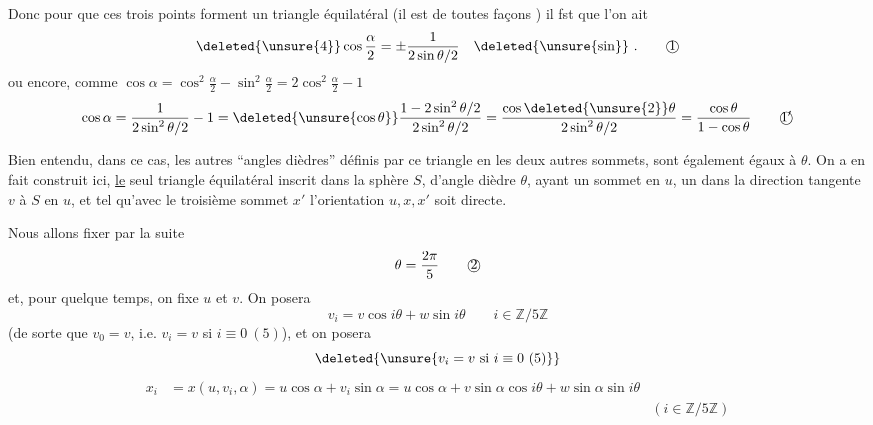 Donc pour que ces trois points forment un triangle équilatéral (il est de toutes façons ) il fst que l'on ait
\[
\deleted{\unsure{4}}\cos\frac{\alpha}{2}=\pm\frac{1}{2\sin\theta/2}\quad\deleted{\unsure{\sin}}\ .\tag*{\textcircled{1}}
\]
ou encore, comme $\cos\alpha=\cos^2\frac{\alpha}{2}-\sin^2\frac{\alpha}{2}=2\cos^2\frac{\alpha}{2}-1$
\[
\cos\alpha=\frac{1}{2\sin^2\theta/2}-1=\deleted{\unsure{\cos\theta}}\frac{1-2\sin^2\theta/2}{2\sin^2\theta/2}
=\frac{\cos\deleted{\unsure{2}}\theta}{2\sin^2\theta/2}=\frac{\cos\theta}{1-\cos\theta}\tag*{\textcircled{$1'$}}
\]

Bien entendu, dans ce cas, les autres ``angles dièdres'' définis par ce triangle en les deux autres sommets, sont également égaux à $\theta$. On a en fait construit ici,  \uline{le} seul triangle équilatéral inscrit dans la sphère $S$, d'angle dièdre $\theta$, ayant un sommet en $u$, un   dans la direction tangente $v$ à $S$ en $u$, et  tel qu'avec le troisième sommet $x'$ l'orientation $u,x,x'$ soit directe.

Nous allons fixer par la suite
\[
\theta=\frac{2\pi}{5}\tag*{\textcircled{2}}
\]
et, pour quelque temps, on fixe $u$ et $v$. On posera
\[
v_i=v\cos i\theta+w\sin i\theta\qquad i\in\mathbb Z/5\mathbb Z\tag*{(3)}
\]
(de sorte que $v_0=v$, i.e. $v_i=v$ si $i\equiv0\ (5)$), et on posera
\[
\deleted{\unsure{v_i=v\ \text{si }i\equiv0\ (5)}}
\]
\[
\begin{aligned}
x_i&=x(u,v_i,\alpha)=u\cos\alpha+v_i\sin\alpha
=u\cos\alpha+v\sin\alpha\cos i\theta+w\sin\alpha\sin i\theta\\
&& (i\in\mathbb Z/5\mathbb Z)
\end{aligned}\tag*{(4)}
\]


